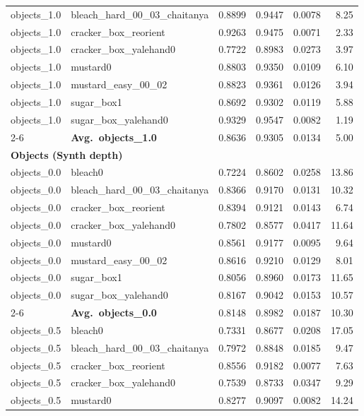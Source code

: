 \begin{longtable}{llrrrr}
  objects_1.0 & bleach\_hard\_00\_03\_chaitanya & 0.8899 & 0.9447 & 0.0078 & 8.25 \\
  objects_1.0 & cracker\_box\_reorient & 0.9263 & 0.9475 & 0.0071 & 2.33 \\
  objects_1.0 & cracker\_box\_yalehand0 & 0.7722 & 0.8983 & 0.0273 & 3.97 \\
  objects_1.0 & mustard0 & 0.8803 & 0.9350 & 0.0109 & 6.10 \\
  objects_1.0 & mustard\_easy\_00\_02 & 0.8823 & 0.9361 & 0.0126 & 3.94 \\
  objects_1.0 & sugar\_box1 & 0.8692 & 0.9302 & 0.0119 & 5.88 \\
  objects_1.0 & sugar\_box\_yalehand0 & 0.9329 & 0.9547 & 0.0082 & 1.19 \\
  \cmidrule{2-6}
  & \textbf{Avg.~objects_1.0} & 0.8636 & 0.9305 & 0.0134 & 5.00 \\
  \midrule
\multicolumn{6}{l}{\textbf{Objects (Synth depth)}} \\
\midrule
  objects_0.0 & bleach0 & 0.7224 & 0.8602 & 0.0258 & 13.86 \\
  objects_0.0 & bleach\_hard\_00\_03\_chaitanya & 0.8366 & 0.9170 & 0.0131 & 10.32 \\
  objects_0.0 & cracker\_box\_reorient & 0.8394 & 0.9121 & 0.0143 & 6.74 \\
  objects_0.0 & cracker\_box\_yalehand0 & 0.7802 & 0.8577 & 0.0417 & 11.64 \\
  objects_0.0 & mustard0 & 0.8561 & 0.9177 & 0.0095 & 9.64 \\
  objects_0.0 & mustard\_easy\_00\_02 & 0.8616 & 0.9210 & 0.0129 & 8.01 \\
  objects_0.0 & sugar\_box1 & 0.8056 & 0.8960 & 0.0173 & 11.65 \\
  objects_0.0 & sugar\_box\_yalehand0 & 0.8167 & 0.9042 & 0.0153 & 10.57 \\
  \cmidrule{2-6}
  & \textbf{Avg.~objects_0.0} & 0.8148 & 0.8982 & 0.0187 & 10.30 \\
  \midrule
  objects_0.5 & bleach0 & 0.7331 & 0.8677 & 0.0208 & 17.05 \\
  objects_0.5 & bleach\_hard\_00\_03\_chaitanya & 0.7972 & 0.8848 & 0.0185 & 9.47 \\
  objects_0.5 & cracker\_box\_reorient & 0.8556 & 0.9182 & 0.0077 & 7.63 \\
  objects_0.5 & cracker\_box\_yalehand0 & 0.7539 & 0.8733 & 0.0347 & 9.29 \\
  objects_0.5 & mustard0 & 0.8277 & 0.9097 & 0.0082 & 14.24 \\

\end{longtable}
